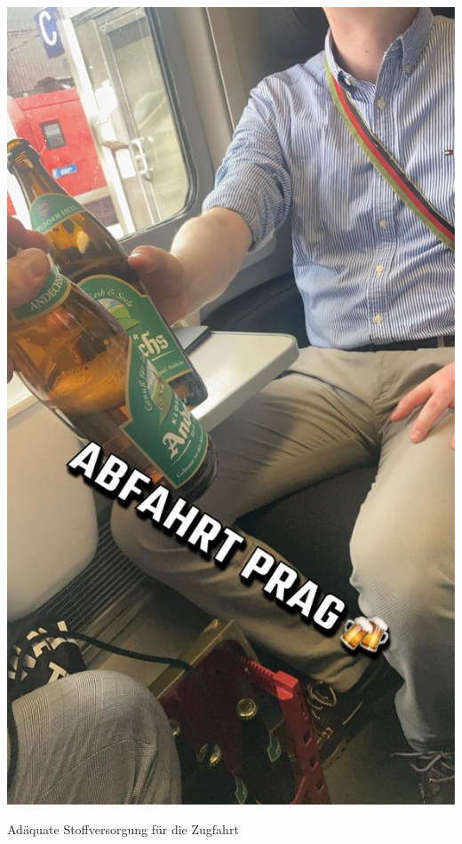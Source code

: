 \begin{center}
\begin{figurehere}
  \includegraphics[width=.7\linewidth]{./Bilder/1.5BackToTheRootsAktivenfahrtPrag/3.bild.jpeg} 
  \caption{Adäquate Stoffversorgung für die Zugfahrt}
\end{figurehere}
\end{center}

